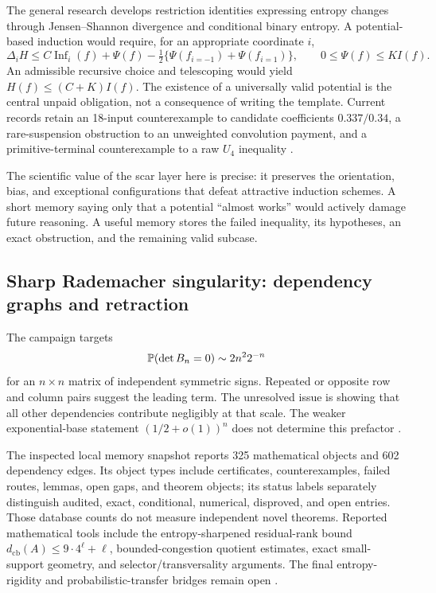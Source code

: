 The general research develops restriction identities expressing entropy changes through Jensen--Shannon divergence and conditional binary entropy. A potential-based induction would require, for an appropriate coordinate $i$,
\[
\Delta_i H\leq C\operatorname{Inf}_i(f)+\Psi(f)
-\tfrac12\{\Psi(f_{i=-1})+\Psi(f_{i=1})\},
\qquad 0\leq\Psi(f)\leq K I(f).
\]
An admissible recursive choice and telescoping would yield $H(f)\leq(C+K)I(f)$. The existence of a universally valid potential is the central unpaid obligation, not a consequence of writing the template. Current records retain an 18-input counterexample to candidate coefficients $0.337/0.34$, a rare-suspension obstruction to an unweighted convolution payment, and a primitive-terminal counterexample to a raw $U_4$ inequality \citep{CaseFEICurrent2026}.

The scientific value of the scar layer here is precise: it preserves the orientation, bias, and exceptional configurations that defeat attractive induction schemes. A short memory saying only that a potential ``almost works'' would actively damage future reasoning. A useful memory stores the failed inequality, its hypotheses, an exact obstruction, and the remaining valid subcase.

\subsection{Sharp Rademacher singularity: dependency graphs and retraction}

The campaign targets
\[
\mathbb{P}(\det B_n=0)\sim 2n^2 2^{-n}
\]
for an $n\times n$ matrix of independent symmetric signs. Repeated or opposite row and column pairs suggest the leading term. The unresolved issue is showing that all other dependencies contribute negligibly at that scale. The weaker exponential-base statement $(1/2+o(1))^n$ does not determine this prefactor \citep{KahnKomlosSzemeredi1995,CaseRademacherMemory2026}.

The inspected local memory snapshot reports 325 mathematical objects and 602 dependency edges. Its object types include certificates, counterexamples, failed routes, lemmas, open gaps, and theorem objects; its status labels separately distinguish audited, exact, conditional, numerical, disproved, and open entries. Those database counts do not measure independent novel theorems. Reported mathematical tools include the entropy-sharpened residual-rank bound $d_{\mathrm{cb}}(A)\leq9\cdot4^\ell+\ell$, bounded-congestion quotient estimates, exact small-support geometry, and selector/transversality arguments. The final entropy-rigidity and probabilistic-transfer bridges remain open \citep{CaseRademacherMemory2026}.

